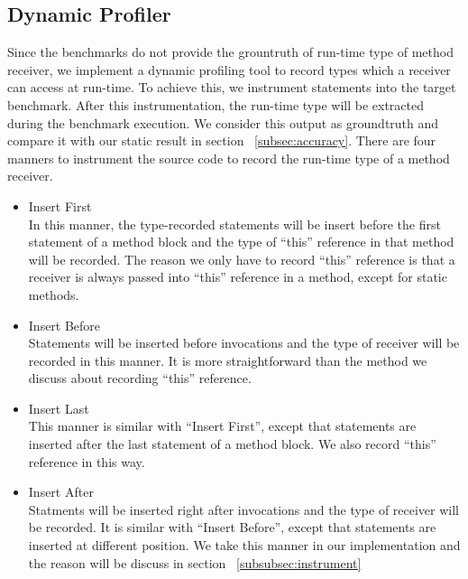 \documentclass{fac}
\begin{document}
\subsection{Dynamic Profiler}\label{subsec:dynamic-profiler}
Since the benchmarks do not provide the grountruth of run-time type of method receiver, we implement a dynamic profiling tool to record  types which a receiver can access at run-time. To achieve this, we instrument statements into the target benchmark. After this instrumentation, the run-time type will be extracted during the benchmark execution. We consider this output as groundtruth and compare it with our static result in section ~\ref{subsec:accuracy}. There are four manners to instrument the source code to record the run-time type of a method receiver.
\begin{itemize}
\item Insert First\\
In this manner, the type-recorded statements will be insert before the first statement of a method block and the type of ``this'' reference in that method will be recorded. The reason we only have to record ``this'' reference is that a receiver is always passed into ``this'' reference in a method, except for static methods.
\item Insert Before\\
Statements will be inserted before invocations and the type of receiver will be recorded in this manner. It is more straightforward than the method we discuss about recording ``this'' reference.
\item Insert Last\\
This manner is similar with ``Insert First'', except that statements are inserted after the last statement of a method block. We also record ``this'' reference in this way.
\item Insert After\\
Statments will be inserted right after invocations and the type of receiver will be recorded. It is similar with ``Insert Before'', except that statements are inserted at different position. We take this manner in our implementation and the reason will be discuss in section ~\ref{subsubsec:instrument}
\end{itemize}
\end{document}
